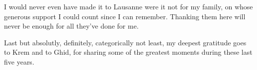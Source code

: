 I would never even have made it to Lausanne were it not for my family, on whose
generous support I could count since I can remember. Thanking them here will
never be enough for all they've done for me. 

Last but absolutly, definitely, categorically not least, my deepest gratitude
goes to Krem and to Ghid, for sharing some of the greatest moments during these
last five years.
